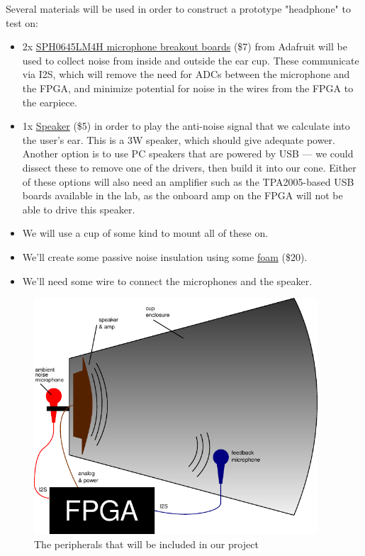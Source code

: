 \documentclass{fpgairpods}
\begin{document}
\begin{multicols}{2}
Several materials will be used in order to construct a prototype "headphone" to test on: 
\begin{itemize}
    \item 2x \href{https://www.adafruit.com/product/3421}{SPH0645LM4H microphone breakout boards} (\$7) from Adafruit will be used to collect noise from inside and outside the ear cup. These communicate via I2S, which will remove the need for ADCs between the microphone and the FPGA, and minimize potential for noise in the wires from the FPGA to the earpiece.
    \item 1x \href{https://www.adafruit.com/product/3968}{Speaker} (\$5) in order to play the anti-noise signal that we calculate into the user's ear. This is a 3W speaker, which should give adequate power. Another option is to use PC speakers that are powered by USB --- we could dissect these to remove one of the drivers, then build it into our cone. Either of these options will also need an amplifier such as the TPA2005-based USB boards available in the lab, as the onboard amp on the FPGA will not be able to drive this speaker.
    \item We will use a cup of some kind to mount all of these on.
    \item We'll create some passive noise insulation using some \href{https://www.amazon.com/Silverstone-21-Inch-Dampening-Acoustic-SF01/dp/B0040JHMH6?th=1}{foam} (\$20).
    \item We'll need some wire to connect the microphones and the speaker.
\end{itemize}

\end{multicols}


\begin{figure}[h]
\centering
\includegraphics[width=300pt]{./figs/system_diagram_with_text.pdf}
\caption{The peripherals that will be included in our project}
\label{fig:peripherals}
\end{figure}
\end{document}
